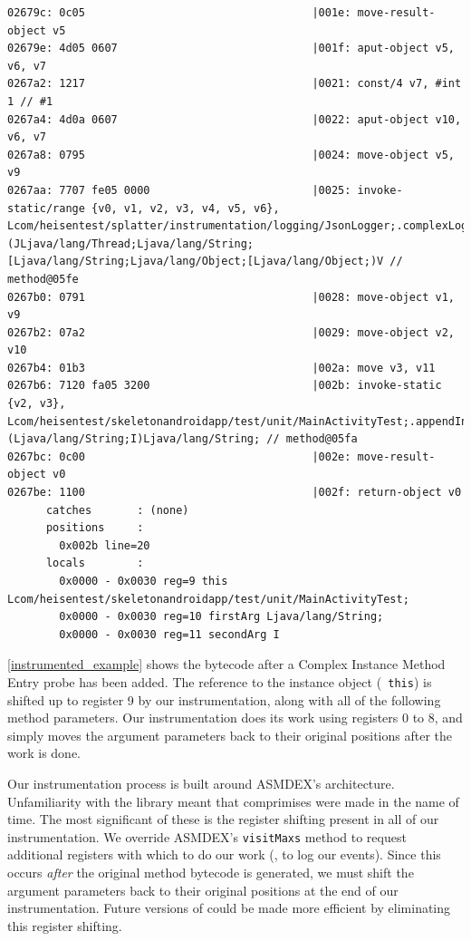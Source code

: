 \begin{lstlisting}[label=instrumented_example]
02679c: 0c05                                   |001e: move-result-object v5
02679e: 4d05 0607                              |001f: aput-object v5, v6, v7
0267a2: 1217                                   |0021: const/4 v7, #int 1 // #1
0267a4: 4d0a 0607                              |0022: aput-object v10, v6, v7
0267a8: 0795                                   |0024: move-object v5, v9
0267aa: 7707 fe05 0000                         |0025: invoke-static/range {v0, v1, v2, v3, v4, v5, v6}, Lcom/heisentest/splatter/instrumentation/logging/JsonLogger;.complexLogInstanceMethodEntry:(JLjava/lang/Thread;Ljava/lang/String;[Ljava/lang/String;Ljava/lang/Object;[Ljava/lang/Object;)V // method@05fe
0267b0: 0791                                   |0028: move-object v1, v9
0267b2: 07a2                                   |0029: move-object v2, v10
0267b4: 01b3                                   |002a: move v3, v11
0267b6: 7120 fa05 3200                         |002b: invoke-static {v2, v3}, Lcom/heisentest/skeletonandroidapp/test/unit/MainActivityTest;.appendIntToString:(Ljava/lang/String;I)Ljava/lang/String; // method@05fa
0267bc: 0c00                                   |002e: move-result-object v0
0267be: 1100                                   |002f: return-object v0
      catches       : (none)
      positions     : 
        0x002b line=20
      locals        : 
        0x0000 - 0x0030 reg=9 this Lcom/heisentest/skeletonandroidapp/test/unit/MainActivityTest; 
        0x0000 - 0x0030 reg=10 firstArg Ljava/lang/String; 
        0x0000 - 0x0030 reg=11 secondArg I 
\end{lstlisting}

\autoref{instrumented_example} shows the bytecode after a Complex Instance
Method Entry probe has been added. The reference to the instance object ({\tt
this}) is shifted up to register 9 by our instrumentation, along with all of the
following method parameters. Our instrumentation does its work using registers 0
to 8, and simply moves the argument parameters back to their original positions
after the work is done.

Our instrumentation process is built around ASMDEX's architecture. Unfamiliarity
with the library meant that comprimises were made in the name of time. The most
significant of these is the register shifting present in all of our
instrumentation. We override ASMDEX's {\tt visitMaxs} method to request
additional registers with which to do our work (\ie, to log our events). Since
this occurs \textit{after} the original method bytecode is generated, we must
shift the argument parameters back to their original positions at the end of our
instrumentation. Future versions of \splatter could be made more efficient by
eliminating this register shifting.

